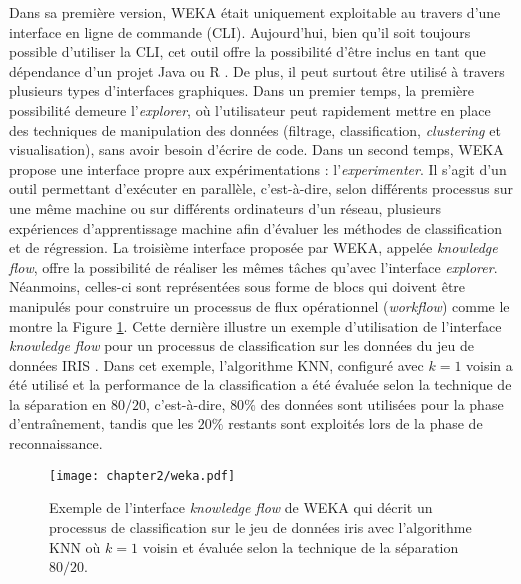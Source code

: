 Dans sa première version, \acs{WEKA} était uniquement exploitable au travers d'une interface en ligne de commande (\acs{CLI}). Aujourd'hui, bien qu'il soit toujours possible d'utiliser la \acs{CLI}, cet outil offre la possibilité d'être inclus en tant que dépendance d'un projet Java ou \textsf{R} \citep{Hornik2009}. De plus, il peut surtout être utilisé à travers plusieurs types d'interfaces graphiques. Dans un premier temps, la première possibilité demeure l'\emph{explorer}, où l'utilisateur peut rapidement mettre en place des techniques de manipulation des données (filtrage, classification, \textit{clustering} et visualisation), sans avoir besoin d'écrire de code. Dans un second temps, \acs{WEKA} propose une interface propre aux expérimentations : l'\emph{experimenter}. Il s'agit d'un outil permettant d'exécuter en parallèle, c'est-à-dire, selon différents processus sur une même machine ou sur différents ordinateurs d'un réseau, plusieurs expériences d'apprentissage machine afin d'évaluer les méthodes de classification et de régression. La troisième interface proposée par \acs{WEKA}, appelée \emph{knowledge flow}, offre la possibilité de réaliser les mêmes tâches qu'avec l'interface \emph{explorer}. Néanmoins, celles-ci sont représentées sous forme de blocs qui doivent être manipulés pour construire un processus de flux opérationnel (\textit{workflow}) comme le montre la Figure \ref{fig:weka}. Cette dernière illustre un exemple d'utilisation de l'interface \emph{knowledge flow} pour un processus de classification sur les données du jeu de données IRIS \citep{Asuncion2007}. Dans cet exemple, l'algorithme \acs{KNN}, configuré avec $k=1$ voisin a été utilisé et la performance de la classification a été évaluée selon la technique de la séparation en $80/20$, c'est-à-dire, $80\%$ des données sont utilisées pour la phase d'entraînement, tandis que les $20\%$ restants sont exploités lors de la phase de reconnaissance.

\begin{figure}[H]
	\centering
	\texttt{[image: chapter2/weka.pdf]}
        \caption{Exemple de l'interface \textit{knowledge flow} de \acs{WEKA} qui décrit un processus de classification sur le jeu de données iris avec l'algorithme \acs{KNN} où $k=1$ voisin et évaluée selon la technique de la séparation $80/20$.}
	\label{fig:weka}
\end{figure}

